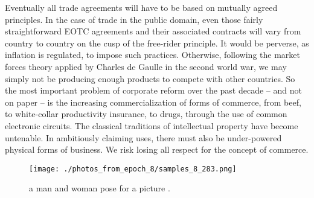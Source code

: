 \documentclass{article}%
\begin{document}
Eventually all trade agreements will have to be based on mutually agreed principles. In the case of trade in the public domain, even those fairly straightforward EOTC agreements and their associated contracts will vary from country to country on the cusp of the free{-}rider principle. It would be perverse, as inflation is regulated, to impose such practices. Otherwise, following the market forces theory applied by Charles de Gaulle in the second world war, we may simply not be producing enough products to compete with other countries.\newline%
So the most important problem of corporate reform over the past decade – and not on paper – is the increasing commercialization of forms of commerce, from beef, to white{-}collar productivity insurance, to drugs, through the use of common electronic circuits. The classical traditions of intellectual property have become untenable. In ambitiously claiming uses, there must also be under{-}powered physical forms of business. We risk losing all respect for the concept of commerce.\newline%

%


\begin{figure}[h!]%
\centering%
\texttt{[image: ./photos\_from\_epoch\_8/samples\_8\_283.png]}%
\caption{a man and woman pose for a picture .}%
\end{figure}

%
\end{document}
